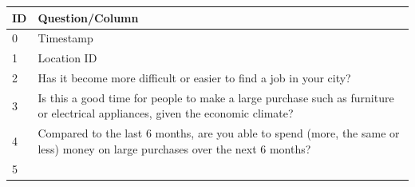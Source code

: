 \begin{longtable}[]{@{}ll@{}}
\toprule
\begin{minipage}[b]{0.05\columnwidth}\raggedright
ID\strut
\end{minipage} & \begin{minipage}[b]{0.89\columnwidth}\raggedright
Question/Column\strut
\end{minipage}\tabularnewline
\midrule
\endhead
\begin{minipage}[t]{0.05\columnwidth}\raggedright
0\strut
\end{minipage} & \begin{minipage}[t]{0.89\columnwidth}\raggedright
Timestamp\strut
\end{minipage}\tabularnewline
\begin{minipage}[t]{0.05\columnwidth}\raggedright
1\strut
\end{minipage} & \begin{minipage}[t]{0.89\columnwidth}\raggedright
Location ID\strut
\end{minipage}\tabularnewline
\begin{minipage}[t]{0.05\columnwidth}\raggedright
2\strut
\end{minipage} & \begin{minipage}[t]{0.89\columnwidth}\raggedright
Has it become more difficult or easier to find a job in your city?\strut
\end{minipage}\tabularnewline
\begin{minipage}[t]{0.05\columnwidth}\raggedright
3\strut
\end{minipage} & \begin{minipage}[t]{0.89\columnwidth}\raggedright
Is this a good time for people to make a large purchase such as
furniture or electrical appliances, given the economic climate?\strut
\end{minipage}\tabularnewline
\begin{minipage}[t]{0.05\columnwidth}\raggedright
4\strut
\end{minipage} & \begin{minipage}[t]{0.89\columnwidth}\raggedright
Compared to the last 6 months, are you able to spend (more, the same or
less) money on large purchases over the next 6 months?\strut
\end{minipage}\tabularnewline
\begin{minipage}[t]{0.05\columnwidth}\raggedright
5\strut
\end{minipage} & \begin{minipage}[t]{0.89\columnwidth}\raggedright

\end{minipage}
\end{longtable}
